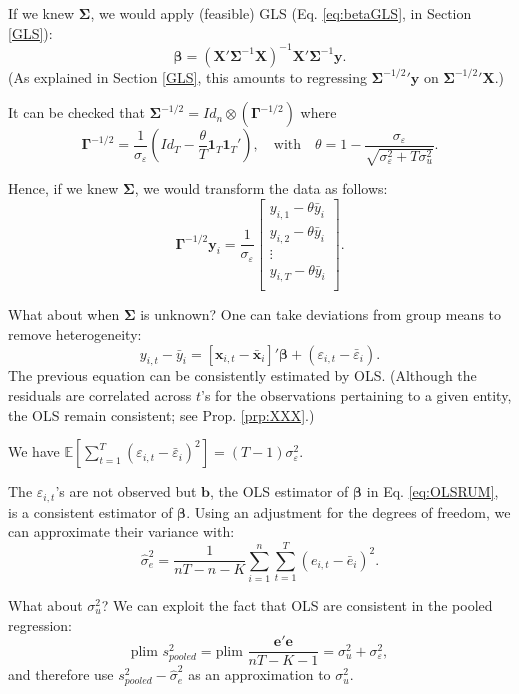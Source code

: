 \documentclass[
  12pt,
]{book}
\theoremstyle{definition}
\theoremstyle{definition}
\theoremstyle{definition}
\theoremstyle{definition}
\theoremstyle{remark}
\begin{document}
If we knew \(\boldsymbol\Sigma\), we would apply (feasible) GLS (Eq. \eqref{eq:betaGLS}, in Section \ref{GLS}):
\[
\boldsymbol\beta = (\mathbf{X}'\boldsymbol\Sigma^{-1}\mathbf{X})^{-1}\mathbf{X}'\boldsymbol\Sigma^{-1}\mathbf{y}.
\]
(As explained in Section \ref{GLS}, this amounts to regressing \({\boldsymbol\Sigma^{-1/2}}'\mathbf{y}\) on \({\boldsymbol\Sigma^{-1/2}}'\mathbf{X}\).)

It can be checked that \(\boldsymbol\Sigma^{-1/2} = Id_n \otimes (\boldsymbol\Gamma^{-1/2})\) where
\[
\boldsymbol\Gamma^{-1/2} = \frac{1}{\sigma_\varepsilon}\left( Id_T - \frac{\theta}{T}\mathbf{1}_T\mathbf{1}_T'\right),\quad \mbox{with}\quad\theta = 1 - \frac{\sigma_\varepsilon}{\sqrt{\sigma_\varepsilon^2+T\sigma_u^2}}.
\]

Hence, if we knew \(\boldsymbol\Sigma\), we would transform the data as follows:
\[
\boldsymbol\Gamma^{-1/2}\mathbf{y}_i = \frac{1}{\sigma_\varepsilon}\left[\begin{array}{c}y_{i,1} - \theta\bar{y}_i\\y_{i,2} - \theta\bar{y}_i\\\vdots\\y_{i,T} - \theta\bar{y}_i\\\end{array}\right].
\]

What about when \(\boldsymbol\Sigma\) is unknown? One can take deviations from group means to remove heterogeneity:
\begin{equation}
y_{i,t} - \bar{y}_i = [\mathbf{x}_{i,t} - \bar{\mathbf{x}}_i]'\boldsymbol\beta + (\varepsilon_{i,t} - \bar{\varepsilon}_i).\label{eq:OLSRUM}
\end{equation}
The previous equation can be consistently estimated by OLS. (Although the residuals are correlated across \(t\)'s for the observations pertaining to a given entity, the OLS remain consistent; see Prop. \ref{prp:XXX}.)

We have \(\mathbb{E}\left[\sum_{t=1}^{T}(\varepsilon_{i,t}-\bar{\varepsilon}_i)^2\right] = (T-1)\sigma_{\varepsilon}^2\).

The \(\varepsilon_{i,t}\)'s are not observed but \(\mathbf{b}\), the OLS estimator of \(\boldsymbol\beta\) in Eq. \eqref{eq:OLSRUM}, is a consistent estimator of \(\boldsymbol\beta\). Using an adjustment for the degrees of freedom, we can approximate their variance with:
\[
\hat{\sigma}_e^2 = \frac{1}{nT-n-K}\sum_{i=1}^{n}\sum_{t=1}^{T}(e_{i,t} - \bar{e}_i)^2.
\]

What about \(\sigma_u^2\)? We can exploit the fact that OLS are consistent in the pooled regression:
\[
\mbox{plim }s^2_{pooled} = \mbox{plim }\frac{\mathbf{e}'\mathbf{e}}{nT-K-1} = \sigma_u^2 + \sigma_\varepsilon^2,
\]
and therefore use \(s^2_{pooled} - \hat{\sigma}_e^2\) as an approximation to \(\sigma_u^2\).
\end{document}

